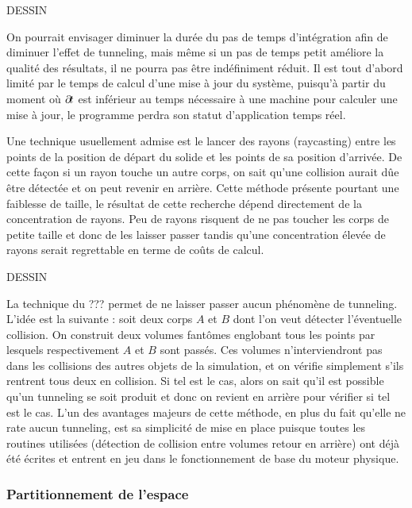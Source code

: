 DESSIN

On pourrait envisager diminuer la durée du pas de temps d'intégration afin de diminuer l'effet de tunneling, mais même si un pas de temps petit améliore la qualité des résultats, il ne pourra pas être indéfiniment réduit. Il est tout d'abord limité par le temps de calcul d'une mise à jour du système, puisqu'à partir du moment o\`u $\partial \! t$ est inférieur au temps nécessaire à une machine pour calculer une mise à jour, le programme perdra son statut d'application temps réel.

Une technique usuellement admise est le lancer des rayons (raycasting) entre les points de la position de départ du solide et les points de sa position d'arrivée. De cette façon si un rayon touche un autre corps, on sait qu'une collision aurait dûe être détectée et on peut revenir en arrière. Cette méthode présente pourtant une faiblesse de taille, le résultat de cette recherche dépend directement de la concentration de rayons. Peu de rayons risquent de ne pas toucher les corps de petite taille et donc de les laisser passer tandis qu'une concentration élevée de rayons serait regrettable en terme de coûts de calcul. 

DESSIN

La technique du ??? permet de ne laisser passer aucun phénomène de tunneling. L'idée est la suivante : soit deux corps $A$ et $B$ dont l'on veut détecter l'éventuelle collision. On construit deux volumes fantômes englobant tous les points par lesquels respectivement $A$ et $B$ sont passés. Ces volumes n'interviendront pas dans les collisions des autres objets de la simulation, et on vérifie simplement s'ils rentrent tous deux en collision. Si tel est le cas, alors on sait qu'il est possible qu'un tunneling se soit produit et donc on revient en arrière pour vérifier si tel est le cas. L'un des avantages majeurs de cette méthode, en plus du fait qu'elle ne rate aucun tunneling, est sa simplicité de mise en place puisque toutes les routines utilisées (détection de collision entre volumes retour en arrière) ont déjà été écrites et entrent en jeu dans le fonctionnement de base du moteur physique.

\subsubsection{Partitionnement de l'espace}



